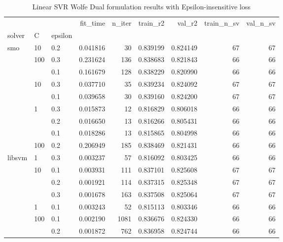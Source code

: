 \begin{table}[H]
\centering
\caption{Linear SVR Wolfe Dual formulation results with Epsilon-insensitive loss}
\label{linear_dual_svr_cv_results}
\begin{tabular}{lllrrrrrr}
\toprule
       &     &     &  fit\_time &  n\_iter &  train\_r2 &    val\_r2 &  train\_n\_sv &  val\_n\_sv \\
solver & C & epsilon &           &         &           &           &             &           \\
\midrule
smo & 10  & 0.2 &  0.041816 &      30 &  0.839199 &  0.824149 &          67 &        67 \\
       & 100 & 0.3 &  0.231624 &     136 &  0.838683 &  0.821843 &          66 &        66 \\
       &     & 0.1 &  0.161679 &     128 &  0.838229 &  0.820990 &          66 &        66 \\
       & 10  & 0.3 &  0.037710 &      35 &  0.839234 &  0.824092 &          67 &        67 \\
       &     & 0.1 &  0.039658 &      30 &  0.839160 &  0.824200 &          67 &        67 \\
       & 1   & 0.3 &  0.015873 &      12 &  0.816829 &  0.806018 &          66 &        66 \\
       &     & 0.2 &  0.016650 &      13 &  0.816266 &  0.805431 &          66 &        66 \\
       &     & 0.1 &  0.018286 &      13 &  0.815865 &  0.804998 &          66 &        66 \\
       & 100 & 0.2 &  0.206949 &     185 &  0.838469 &  0.821431 &          66 &        66 \\
libsvm & 1   & 0.3 &  0.003237 &      57 &  0.816092 &  0.803425 &          66 &        66 \\
       & 10  & 0.1 &  0.003931 &     111 &  0.837101 &  0.825608 &          67 &        67 \\
       &     & 0.2 &  0.001921 &     114 &  0.837315 &  0.825348 &          67 &        67 \\
       &     & 0.3 &  0.001678 &     163 &  0.837508 &  0.825064 &          67 &        67 \\
       & 1   & 0.1 &  0.003243 &      52 &  0.815113 &  0.803346 &          66 &        66 \\
       & 100 & 0.1 &  0.002190 &    1081 &  0.836676 &  0.824330 &          66 &        66 \\
       &     & 0.2 &  0.001872 &     762 &  0.836958 &  0.824744 &          66 &        66 \\

\end{tabular}
\end{table}
